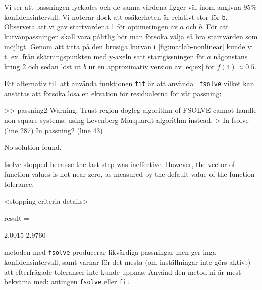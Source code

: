 Vi ser att passningen lyckades och de sanna värdena ligger väl inom
angivna 95\%  konfidensintervall. Vi noterar dock att osäkerheten är
relativt stor för {\tt b}. Observera att vi gav startvärdena 1 för
optimeringen av $a$ och $b$. För att kurvanpassningen skall vara pålitlig
bör man försöka välja så bra startvärden som möjligt. Genom att titta på
den brusiga kurvan i \cref{fig:matlab-nonlinear} kunde vi t. ex. från
skärningspunkten med y-axeln satt startgissningen för $a$ någonstans
kring 2 och sedan löst ut $b$ ur en approximativ version av \cref{eq:ex} för
$f(4) \approx 0.5$.

Ett alternativ till att använda funktionen {\tt fit} är att använda {\tt
  fsolve} vilket kan ansättas att försöka lösa en ekvation för
residualerna för vår passning:


\begin{terminaloutput}
>> passning2
Warning: Trust-region-dogleg algorithm of FSOLVE cannot handle non-square systems; using Levenberg-Marquardt algorithm instead. 
> In fsolve (line 287)
  In passning2 (line 43) 

No solution found.

fsolve stopped because the last step was ineffective. However, the vector of function
values is not near zero, as measured by the default value of the function tolerance. 

<stopping criteria details>


result =

    2.0015    2.9760
\end{terminaloutput}

metoden med {\tt fsolve} producerar likvärdiga passningar men ger
inga konfidensintervall, samt varnar för det mesta (om inställningar inte
görs aktivt) att efterfrågade toleranser inte kunde uppnås. Använd den
metod ni är mest bekväma med: antingen {\tt fsolve} eller {\tt fit}.


